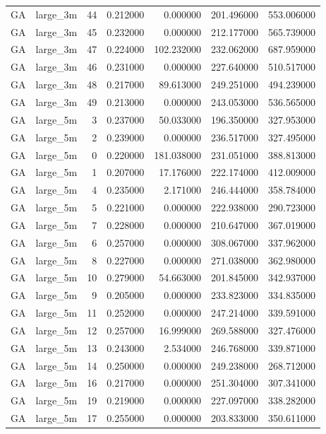 \begin{tabular}{llrrrrr}
GA & large_3m & 44 & 0.212000 & 0.000000 & 201.496000 & 553.006000 \\
GA & large_3m & 45 & 0.232000 & 0.000000 & 212.177000 & 565.739000 \\
GA & large_3m & 47 & 0.224000 & 102.232000 & 232.062000 & 687.959000 \\
GA & large_3m & 46 & 0.231000 & 0.000000 & 227.640000 & 510.517000 \\
GA & large_3m & 48 & 0.217000 & 89.613000 & 249.251000 & 494.239000 \\
GA & large_3m & 49 & 0.213000 & 0.000000 & 243.053000 & 536.565000 \\
GA & large_5m & 3 & 0.237000 & 50.033000 & 196.350000 & 327.953000 \\
GA & large_5m & 2 & 0.239000 & 0.000000 & 236.517000 & 327.495000 \\
GA & large_5m & 0 & 0.220000 & 181.038000 & 231.051000 & 388.813000 \\
GA & large_5m & 1 & 0.207000 & 17.176000 & 222.174000 & 412.009000 \\
GA & large_5m & 4 & 0.235000 & 2.171000 & 246.444000 & 358.784000 \\
GA & large_5m & 5 & 0.221000 & 0.000000 & 222.938000 & 290.723000 \\
GA & large_5m & 7 & 0.228000 & 0.000000 & 210.647000 & 367.019000 \\
GA & large_5m & 6 & 0.257000 & 0.000000 & 308.067000 & 337.962000 \\
GA & large_5m & 8 & 0.227000 & 0.000000 & 271.038000 & 362.980000 \\
GA & large_5m & 10 & 0.279000 & 54.663000 & 201.845000 & 342.937000 \\
GA & large_5m & 9 & 0.205000 & 0.000000 & 233.823000 & 334.835000 \\
GA & large_5m & 11 & 0.252000 & 0.000000 & 247.214000 & 339.591000 \\
GA & large_5m & 12 & 0.257000 & 16.999000 & 269.588000 & 327.476000 \\
GA & large_5m & 13 & 0.243000 & 2.534000 & 246.768000 & 339.871000 \\
GA & large_5m & 14 & 0.250000 & 0.000000 & 249.238000 & 268.712000 \\
GA & large_5m & 16 & 0.217000 & 0.000000 & 251.304000 & 307.341000 \\
GA & large_5m & 19 & 0.219000 & 0.000000 & 227.097000 & 338.282000 \\
GA & large_5m & 17 & 0.255000 & 0.000000 & 203.833000 & 350.611000 \\

\end{tabular}
